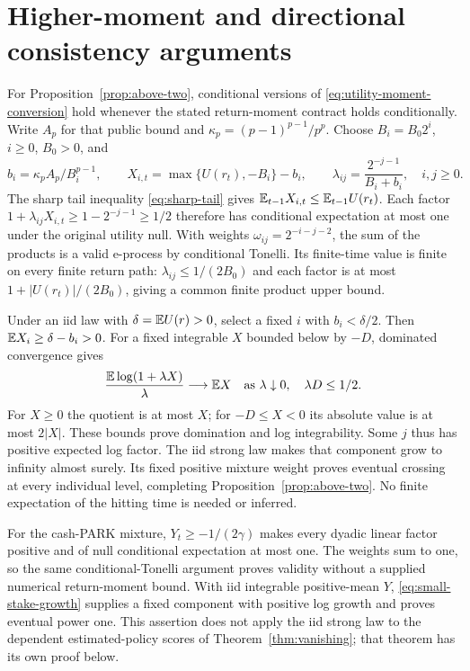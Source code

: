 \section{Higher-moment and directional consistency arguments}
\label{app:directional}
For Proposition~\ref{prop:above-two}, conditional versions of
\eqref{eq:utility-moment-conversion} hold whenever the stated return-moment
contract holds conditionally. Write $A_p$ for that public bound and
$\kappa_p=(p-1)^{p-1}/p^p$. Choose $B_i=B_0 2^i$, $i\ge0$, $B_0>0$, and
\[
 b_i=\kappa_p A_p/B_i^{p-1},\qquad
 X_{i,t}=\max\{U(r_t),-B_i\}-b_i,\qquad
 \lambda_{ij}=\frac{2^{-j-1}}{B_i+b_i},\quad i,j\ge0.
\]
The sharp tail inequality \eqref{eq:sharp-tail} gives
$\mathbb E_{t-1}X_{i,t}\le\mathbb E_{t-1}U(r_t)$. Each factor
$1+\lambda_{ij}X_{i,t}\ge1-2^{-j-1}\ge1/2$ therefore has conditional
expectation at most one under the original utility null. With weights
$\omega_{ij}=2^{-i-j-2}$, the sum of the products is a valid e-process by
conditional Tonelli. Its finite-time value is finite on every finite return
path: $\lambda_{ij}\le1/(2B_0)$ and each factor is at most
$1+|U(r_t)|/(2B_0)$, giving a common finite product upper bound.

Under an iid law with $\delta=\mathbb E U(r)>0$, select a fixed $i$ with
$b_i<\delta/2$. Then $\mathbb E X_i\ge\delta-b_i>0$. For a fixed integrable $X$
bounded below by $-D$, dominated convergence gives
\begin{equation}
 \frac{\mathbb E\log(1+\lambda X)}{\lambda}\longrightarrow\mathbb E X
 \quad\text{as }\lambda\downarrow0,\quad \lambda D\le1/2.
 \label{eq:small-stake-growth}
\end{equation}
For $X\ge0$ the quotient is at most $X$; for $-D\le X<0$ its absolute value
is at most $2|X|$. These bounds prove domination and log integrability.
Some $j$ thus has positive expected log factor. The iid strong law makes
that component grow to infinity almost surely. Its fixed positive mixture
weight proves eventual crossing at every individual level, completing
Proposition~\ref{prop:above-two}. No finite expectation of the hitting time
is needed or inferred.

For the cash-PARK mixture, $Y_t\ge-1/(2\gamma)$ makes every dyadic linear
factor positive and of null conditional expectation at most one. The weights
sum to one, so the same conditional-Tonelli argument proves validity without
a supplied numerical return-moment bound. With iid integrable positive-mean
$Y$, \eqref{eq:small-stake-growth} supplies a fixed component with positive
log growth and proves eventual power one. This assertion does not apply
the iid strong law to the dependent estimated-policy scores of
Theorem~\ref{thm:vanishing}; that theorem has its own proof below.
